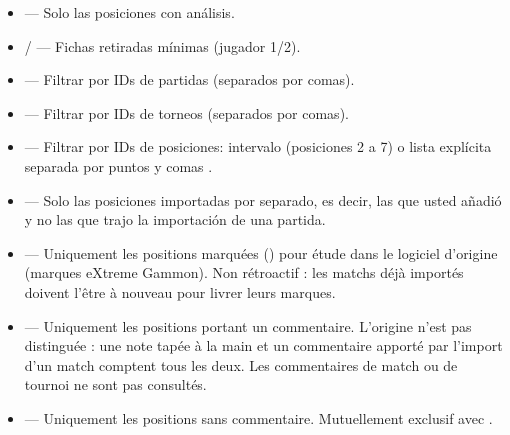 \documentclass[letterpaper,10pt,spanish]{sphinxmanual}
\begin{document}
\begin{itemize}
\item {} 
\sphinxAtStartPar
{} — Solo las posiciones con análisis.

\item {} 
\sphinxAtStartPar
{} /  — Fichas retiradas mínimas (jugador 1/2).

\item {} 
\sphinxAtStartPar
{} — Filtrar por IDs de partidas (separados por comas).

\item {} 
\sphinxAtStartPar
{} — Filtrar por IDs de torneos (separados por comas).

\item {} 
\sphinxAtStartPar
{} — Filtrar por IDs de posiciones: intervalo  (posiciones 2 a 7) o lista explícita separada por puntos y comas .

\item {} 
\sphinxAtStartPar
{} — Solo las posiciones importadas por separado, es decir, las que usted añadió y no las que trajo la importación de una partida.

\item {} 
\sphinxAtStartPar
{} — Uniquement les positions marquées () pour étude dans
le logiciel d’origine (marques eXtreme Gammon). Non rétroactif : les
matchs déjà importés doivent l’être à nouveau pour livrer leurs marques.

\item {} 
\sphinxAtStartPar
{} — Uniquement les positions portant un commentaire.
L’origine n’est pas distinguée : une note tapée à la main et un commentaire
apporté par l’import d’un match comptent tous les deux. Les commentaires de
match ou de tournoi ne sont pas consultés.

\item {} 
\sphinxAtStartPar
{} — Uniquement les positions sans commentaire. Mutuellement
exclusif avec .

\end{itemize}
\end{document}
